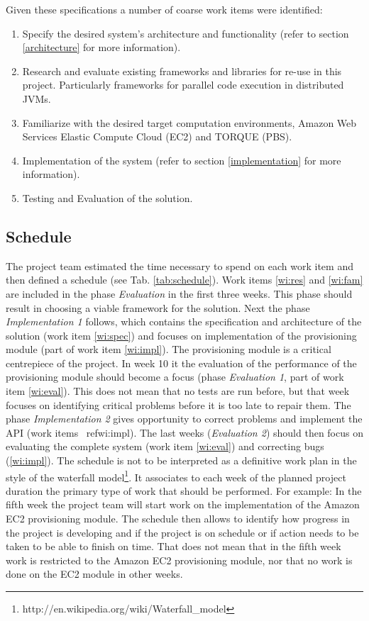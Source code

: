 \documentclass[english]{uzhpub}
\begin{document}
Given these specifications a number of coarse work items were identified:
\begin{enumerate}
\item \label{wi:spec}Specify the desired system's architecture and functionality (refer to section \ref{architecture} for more information).
\item \label{wi:res}Research and evaluate existing frameworks and libraries for re-use in this project. Particularly frameworks for parallel code execution in distributed JVMs.
\item \label{wi:fam}Familiarize with the desired target computation environments, Amazon Web Services Elastic Compute Cloud (EC2) and TORQUE (PBS).
\item \label{wi:impl}Implementation of the system (refer to section \ref{implementation} for more information).
\item \label{wi:eval}Testing and Evaluation of the solution.
\end{enumerate}

\subsection{Schedule}

The project team estimated the time necessary to spend on each work item and then defined a schedule (see Tab. \ref{tab:schedule}). Work items \ref{wi:res} and \ref{wi:fam} are included in the phase \emph{Evaluation} in the first three weeks. This phase should result in choosing a viable framework for the solution. Next the phase \emph{Implementation 1} follows, which contains the specification and architecture of the solution (work item \ref{wi:spec}) and focuses on implementation of the provisioning module (part of work item \ref{wi:impl}). The provisioning module is a critical centrepiece of the project. In week 10 it the evaluation of the performance of the provisioning module should become a focus (phase \emph{Evaluation 1}, part of work item \ref{wi:eval}). This does not mean that no tests are run before, but that week focuses on identifying critical problems before it is too late to repair them. The phase \emph{Implementation 2} gives opportunity to correct problems and implement the API (work items \
ref{wi:impl}). The last weeks (\emph{Evaluation 2}) should then focus on evaluating the complete system (work item \ref{wi:eval}) and correcting bugs (\ref{wi:impl}). The schedule is not to be interpreted as a definitive work plan in the style of the waterfall model\footnote{http://en.wikipedia.org/wiki/Waterfall\_model}. It associates to each week of the planned project duration the primary type of work that should be performed. For example: In the fifth week the project team will start work on the implementation of the Amazon EC2 provisioning module. The schedule then allows to identify how progress in the project is developing and if the project is on schedule or if action needs to be taken to be able to finish on time. That does not mean that in the fifth week work is restricted to the Amazon EC2 provisioning module, nor that no work is done on the EC2 module in other weeks.
\end{document}
